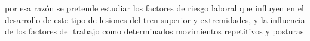 
por esa razón se pretende estudiar los factores de riesgo laboral que influyen en el desarrollo de este tipo de lesiones del tren superior y extremidades, y la influencia de los factores del trabajo como determinados movimientos repetitivos y posturas
